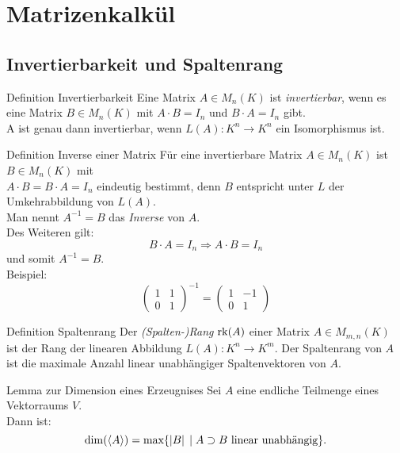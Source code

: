 \documentclass[main.tex]{subfiles}
\begin{document}
\section*{Matrizenkalkül}
\subsection*{Invertierbarkeit und Spaltenrang}

\begin{karte}{Definition Invertierbarkeit}
    Eine Matrix \(A \in M_n(K)\) ist \textit{invertierbar},
    wenn es eine Matrix \(B \in M_n(K)\) mit \(A \cdot B = I_n\) 
    und \(B \cdot A = I_n\) gibt.\\
    A ist genau dann invertierbar, wenn \(L(A): K^n \rightarrow K^n \)
    ein Isomorphismus ist.
\end{karte}
\begin{karte}{Definition Inverse einer Matrix}
    Für eine invertierbare Matrix \(A \in M_n(K)\) ist \(B \in M_n(K)\) 
    mit \\
     \(A \cdot B = B \cdot A = I_n\)
    eindeutig bestimmt, denn \(B\) entspricht unter \(L\) 
    der Umkehrabbildung von \(L(A)\). \\
    Man nennt \(A^{-1} = B\) das \textit{Inverse} von \(A\).\\
    Des Weiteren gilt: 
    \[B \cdot A = I_n \Rightarrow A \cdot B = I_n\] 
    und somit \(A^{-1} = B\).\\
    Beispiel: 
    \[ \begin{pmatrix}
        1 & 1 \\
        0 & 1
    \end{pmatrix}^{-1} = 
    \begin{pmatrix}
        1 & -1 \\
        0 & 1
    \end{pmatrix} \]
\end{karte}
\begin{karte}{Definition Spaltenrang}
    Der \textit{(Spalten-)Rang} \(\operatorname{rk}(A)\) einer Matrix
    \(A \in M_{m,n}(K)\) ist der Rang der linearen Abbildung 
    \(L(A): K^n \rightarrow K^m\).
    Der Spaltenrang von \(A\) ist die maximale Anzahl linear unabhängiger 
    Spaltenvektoren von \(A\).
\end{karte}
\begin{karte}{Lemma zur Dimension eines Erzeugnises}
    Sei \(A\) eine endliche Teilmenge eines Vektorraums \(V\). \\
    Dann ist: 
    \[\dim(\langle A \rangle) = \text{max}\{\left| B \right| \;\vert\; 
    A \supset B \text{ linear unabhängig}\}.\]
\end{karte}
\end{document}
